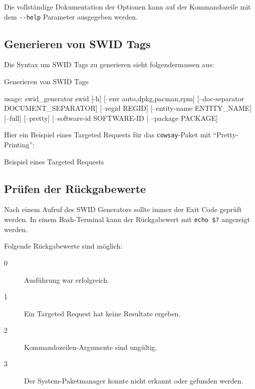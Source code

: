 Die vollständige Dokumentation der Optionen kann auf der Kommandozeile mit dem
\texttt{-{}-help} Parameter ausgegeben werden.


\subsection{Generieren von SWID Tags}

Die Syntax um SWID Tags zu generieren sieht folgendermassen aus:

\begin{listing}[H]
\caption{Generieren von SWID Tags}
\begin{textcode}
usage: swid_generator swid [-h] [--env {auto,dpkg,pacman,rpm}]
                           [--doc-separator DOCUMENT_SEPARATOR]
                           [--regid REGID] [--entity-name ENTITY_NAME]
                           [--full] [--pretty]
                           [--software-id SOFTWARE-ID | --package PACKAGE]
\end{textcode}
\end{listing}

Hier ein Beispiel eines Targeted Requests für das \texttt{cowsay}-Paket mit
\enquote{Pretty-Printing}:

\begin{listing}[H]
\caption{Beispiel eines Targeted Requests}
\end{listing}


\subsection{Prüfen der Rückgabewerte}

Nach einem Aufruf des SWID Generators sollte immer der Exit Code geprüft
werden. In einem Bash-Terminal kann der Rückgabewert mit \texttt{echo \$?}
angezeigt werden.

Folgende Rückgabewerte sind möglich:

\begin{description}
	\item[0] Ausführung war erfolgreich.
	\item[1] Ein Targeted Request hat keine Resultate ergeben.
	\item[2] Kommandozeilen-Argumente sind ungültig.
	\item[3] Der System-Paketmanager konnte nicht erkannt oder gefunden werden.
\end{description}


